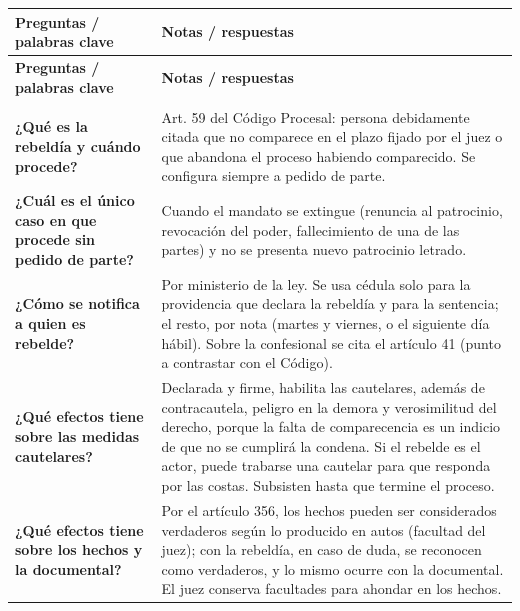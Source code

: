 \documentclass[12pt,oneside]{book}
\begin{document}
\begingroup
\renewcommand{\arraystretch}{1.25}
\begin{longtable}{
    >{\raggedright\arraybackslash}p{}
    >{\raggedright\arraybackslash}p{}
}
\toprule
\textbf{Preguntas / palabras clave} & \textbf{Notas / respuestas} \\
\midrule
\endfirsthead
\toprule
\textbf{Preguntas / palabras clave} & \textbf{Notas / respuestas} \\
\midrule
\endhead
\midrule
\multicolumn{2}{r}{\small contin\'ua en la p\'agina siguiente} \\
\endfoot
\bottomrule
\endlastfoot

\textbf{¿Qu\'e es la rebeld\'ia y cu\'ando procede?} &
Art. 59 del C\'odigo Procesal: persona debidamente citada que no comparece en el plazo fijado por el juez o que abandona el proceso habiendo comparecido. Se configura siempre a pedido de parte. \\[0.6em]

\textbf{¿Cu\'al es el \'unico caso en que procede sin pedido de parte?} &
Cuando el mandato se extingue (renuncia al patrocinio, revocaci\'on del poder, fallecimiento de una de las partes) y no se presenta nuevo patrocinio letrado. \\[0.6em]

\textbf{¿C\'omo se notifica a quien es rebelde?} &
Por ministerio de la ley. Se usa c\'edula solo para la providencia que declara la rebeld\'ia y para la sentencia; el resto, por nota (martes y viernes, o el siguiente d\'ia h\'abil). Sobre la confesional se cita el art\'iculo 41 (punto a contrastar con el C\'odigo). \\[0.6em]

\textbf{¿Qu\'e efectos tiene sobre las medidas cautelares?} &
Declarada y firme, habilita las cautelares, adem\'as de contracautela, peligro en la demora y verosimilitud del derecho, porque la falta de comparecencia es un indicio de que no se cumplir\'a la condena. Si el rebelde es el actor, puede trabarse una cautelar para que responda por las costas. Subsisten hasta que termine el proceso. \\[0.6em]

\textbf{¿Qu\'e efectos tiene sobre los hechos y la documental?} &
Por el art\'iculo 356, los hechos pueden ser considerados verdaderos seg\'un lo producido en autos (facultad del juez); con la rebeld\'ia, en caso de duda, se reconocen como verdaderos, y lo mismo ocurre con la documental. El juez conserva facultades para ahondar en los hechos. \\[0.6em]


\end{longtable}
\end{document}
